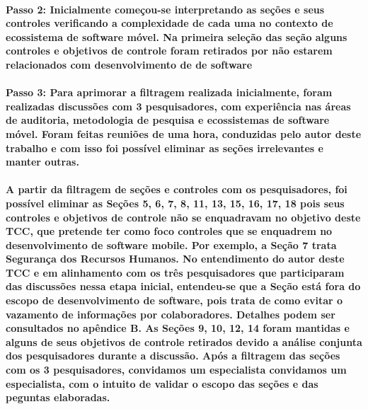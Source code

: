  \noindent \paragraph{\textbf{Passo 2:} Inicialmente começou-se interpretando as seções e seus controles verificando a complexidade de cada uma no contexto de ecossistema de software móvel. Na primeira seleção das seção alguns controles e objetivos de controle foram retirados por não estarem relacionados com desenvolvimento de de software}
 
 \noindent 
    \paragraph{
    \textbf{Passo 3:} Para aprimorar a filtragem realizada inicialmente, foram realizadas discussões com 3 pesquisadores, com experiência nas áreas de auditoria, metodologia de pesquisa e ecossistemas de software móvel. Foram feitas reuniões de uma hora, conduzidas pelo autor deste trabalho e com isso foi possível eliminar as seções irrelevantes e manter outras.
    }
 
    \paragraph{
  A partir da filtragem de seções e controles com os pesquisadores, foi possível eliminar as Seções 5, 6, 7, 8, 11, 13, 15, 16, 17, 18 pois seus controles e objetivos de controle não se enquadravam no objetivo deste TCC, que  pretende ter como foco controles que se enquadrem no desenvolvimento de software mobile. Por exemplo, a Seção 7 trata Segurança dos Recursos Humanos. No entendimento do autor deste TCC e em alinhamento com os três pesquisadores que participaram das discussões nessa etapa inicial, entendeu-se que a Seção está fora do escopo de desenvolvimento de software, pois trata de como evitar o vazamento de informações por colaboradores. Detalhes podem ser consultados no apêndice B. %
  As Seções 9, 10, 12, 14 foram mantidas e alguns de seus objetivos de controle retirados devido a análise conjunta dos pesquisadores durante a discussão. Após a filtragem das seções com os 3 pesquisadores, convidamos um especialista convidamos um especialista, com o intuito de validar o escopo das seções e das peguntas elaboradas.  
    }
    
  \noindent
